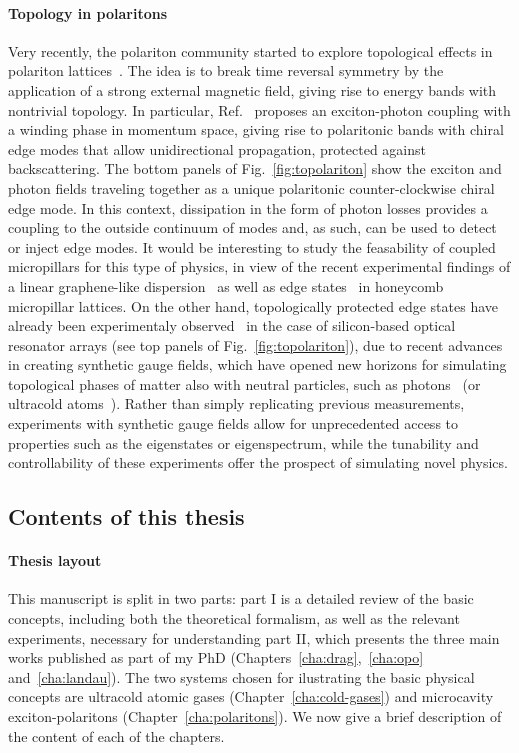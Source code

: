 \paragraph{Topology in polaritons}
Very recently, the polariton community started to explore topological
effects in polariton lattices~\cite{PhysRevB.93.020502,
  PhysRevB.91.161413, PhysRevLett.114.116401, PhysRevB.93.085438,
  PhysRevX.5.031001}. The idea is to break time reversal symmetry by
the application of a strong external magnetic field, giving rise to
energy bands with nontrivial topology. In particular,
Ref.~\cite{PhysRevX.5.031001} proposes an exciton-photon coupling with
a winding phase in momentum space, giving rise to polaritonic bands
with chiral edge modes that allow unidirectional propagation,
protected against backscattering. The bottom panels of
Fig.~\ref{fig:topolariton} show the exciton and photon fields
traveling together as a unique polaritonic counter-clockwise chiral
edge mode. In this context, dissipation in the form of photon losses
provides a coupling to the outside continuum of modes and, as such,
can be used to detect or inject edge modes.
%
It would be interesting to study the feasability of coupled
micropillars for this type of physics, in view of the recent
experimental findings of a linear graphene-like
dispersion~\cite{Jacqmin_2014} as well as edge
states~\cite{polaritonedge} in honeycomb micropillar lattices.  
%
On the other hand, topologically protected edge states have already
been experimentaly observed~\cite{hafezi2013imaging} in the case of
silicon-based optical resonator arrays (see top panels of
Fig.~\ref{fig:topolariton}), due to recent advances in creating
synthetic gauge fields, which have opened new horizons for simulating
topological phases of matter also with neutral particles, such as
photons~\cite{hafezi2014synthetic} (or ultracold
atoms~\cite{dalibardrmp2011, goldman_repprog_2014,
  Goldman_arxiv_2015}). Rather than simply replicating previous
measurements, experiments with synthetic gauge fields allow for
unprecedented access to properties such as the eigenstates or
eigenspectrum, while the tunability and controllability of these
experiments offer the prospect of simulating novel physics.


\subsection*{Contents of this thesis}
\paragraph{Thesis layout}
This manuscript is split in two parts: part I is a detailed review of
the basic concepts, including both the theoretical formalism, as well
as the relevant experiments, necessary for understanding part II,
which presents the three main works published as part of my PhD
(Chapters~\ref{cha:drag},~\ref{cha:opo} and~\ref{cha:landau}). The two
systems chosen for ilustrating the basic physical concepts are
ultracold atomic gases (Chapter~\ref{cha:cold-gases}) and microcavity
exciton-polaritons (Chapter~\ref{cha:polaritons}). We now give a brief
description of the content of each of the chapters.

